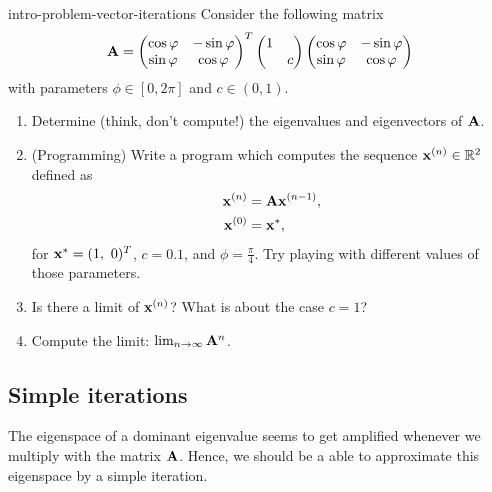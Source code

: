 
\begin{Problem}{intro-problem-vector-iterations}
	Consider the following matrix
	\begin{gather*}
	\mathbf A =
	\begin{pmatrix}
	\cos\varphi & -\sin\varphi\\
	\sin\varphi &  \cos\varphi
	\end{pmatrix}^T
	\begin{pmatrix}
	1 & \\
	& c
	\end{pmatrix}
	\begin{pmatrix}
	\cos\varphi & -\sin\varphi\\
	\sin\varphi &  \cos\varphi
	\end{pmatrix}
	\end{gather*}
	with parameters $\phi\in[0,2\pi]$ and $c\in(0,1)$.
	\begin{enumerate}
		\item Determine (think, don't compute!) the eigenvalues and eigenvectors of $\mathbf A$.
		\item (Programming) Write a program which computes the sequence
		$\mathbf x^{(n)}\in\mathbb R^2$ defined as
		\begin{align*}
		\mathbf x^{(n)} &= \mathbf A \mathbf x^{(n-1)}, \\
		\mathbf x^{(0)} &= \mathbf x^{*},
		\end{align*}
		for $\vx^{*} = (1,\ 0)^T$, $c = 0.1$, and
		$\phi=\frac\pi4$. Try playing with different values of those
		parameters.
		\item Is there a limit of $\mathbf x^{(n)}$? What is about the case
		$c=1$?
		\item Compute the limit: $\lim_{n\to\infty}\mathbf A^n$.
	\end{enumerate}
\end{Problem}

\subsection{Simple iterations}

\begin{intro}
  The eigenspace of a dominant eigenvalue seems to get amplified
  whenever we multiply with the matrix $\mathbf A$. Hence, we should be a
  able to approximate this eigenspace by a simple iteration.
\end{intro}

